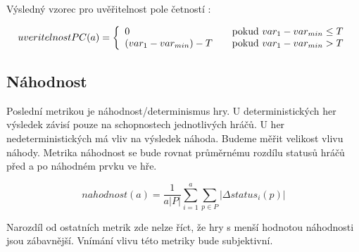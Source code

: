Výsledný vzorec pro uvěřitelnost pole četností :

	\[
	uveritelnostPC(a) = \left\{
  \begin{array}{l l}
    0 & \quad \text{pokud $var_1 - var_{min} \leq T$}\\
    (var_1 - var_{min}) - T & \quad \text{pokud $var_1 - var_{min} > T$}
  \end{array} \right.
\]


\subsection{Náhodnost}

Poslední metrikou je náhodnost/determinismus hry. U deterministických her výsledek závisí pouze na schopnostech jednotlivých hráčů. U her nedeterministických má vliv na výsledek náhoda. Budeme měřit velikost vlivu náhody. Metrika náhodnost se bude rovnat průměrnému rozdílu statusů hráčů před a po náhodném prvku ve hře.

	\[
	nahodnost(a) = \frac{1}{a |P|}\sum_{i=1}^a{\sum_{p \in P} |\Delta status_i(p)|}
\]

Narozdíl od ostatních metrik zde nelze říct, že hry s menší hodnotou náhodnosti jsou zábavnější. Vnímání vlivu této metriky bude subjektivní.
